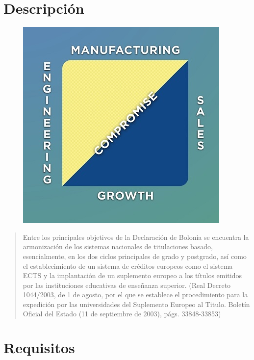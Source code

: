 \documentclass[12pt]{report} %
\begin{document}
\section{Descripción}
\lipsum[19]
\begin{figure}[H]
	{\includegraphics[scale=0.6]{success.jpg}}
\end{figure}

\lipsum[9-10]

\blockquote{Entre los principales objetivos de la Declaración de Bolonia se encuentra la armonización de los sistemas nacionales de titulaciones basado, esencialmente, en los dos ciclos principales de grado y postgrado, así como	el establecimiento de un sistema de créditos europeos como el sistema ECTS y la implantación de un suplemento europeo a los títulos emitidos por las instituciones educativas de  enseñanza  superior. (Real  Decreto  1044/2003,  de  1  de  agosto,  por  el  que  se  establece  el  procedimiento para la expedición por las universidades del Suplemento Europeo al Titulo. Boletín Oficial del Estado (11 de septiembre de 2003), págs. 33848-33853)}

\lipsum[20-22]

\section{Requisitos}
\end{document}
